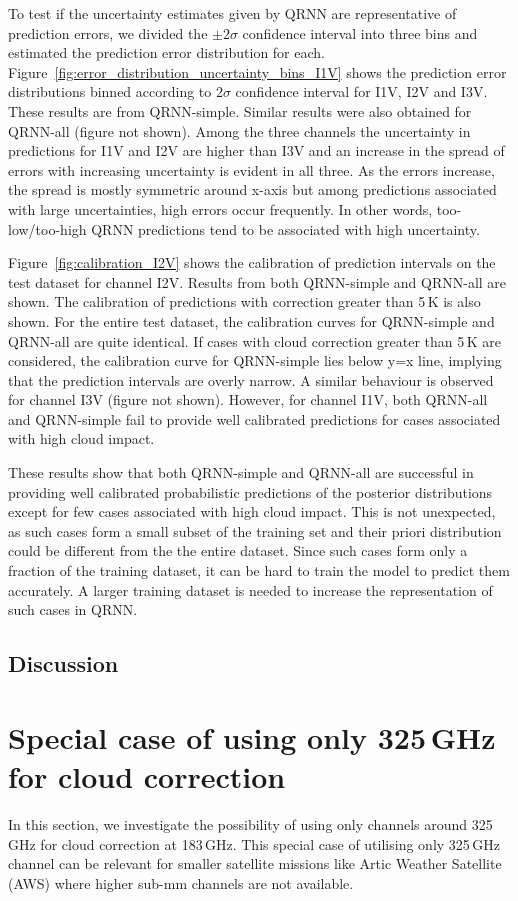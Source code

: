 \documentclass[amt, manuscript]{copernicus}
\begin{document}
To test if the uncertainty estimates given by QRNN are representative of prediction errors, we divided the $\pm2\sigma$ confidence interval into three bins and estimated the prediction error distribution for each. Figure~\ref{fig:error_distribution_uncertainty_bins_I1V} shows the prediction error distributions binned according to $2\sigma$ confidence interval for I1V, I2V and I3V. These results are from QRNN-simple. Similar results were also obtained for QRNN-all (figure not shown). Among the three channels the uncertainty in predictions for I1V and I2V are higher than I3V and an increase in the spread of errors with increasing uncertainty is evident in all three. As the errors increase, the spread is mostly symmetric around x-axis but among predictions associated with large uncertainties, high errors occur frequently. In other words, too-low/too-high QRNN predictions tend to be associated with high uncertainty. 

Figure~\ref{fig:calibration_I2V} shows the calibration of prediction intervals on the test dataset for channel I2V. Results from both QRNN-simple and QRNN-all are shown. The calibration of predictions with correction greater than 5\,K is also shown. For the entire test dataset, the calibration curves for QRNN-simple and QRNN-all are quite identical. If cases with cloud correction greater than 5\,K are considered, the calibration curve for QRNN-simple lies  below y=x line, implying that the prediction intervals are overly narrow. A similar behaviour is observed for channel I3V (figure not shown). However, for channel I1V, both QRNN-all and QRNN-simple fail to provide well calibrated predictions for cases associated with high cloud impact. 

These results show that both QRNN-simple and QRNN-all are successful in providing well calibrated probabilistic predictions of the posterior distributions except for few cases associated with high cloud impact. This is not unexpected, as such cases form a small subset of the training set and their priori distribution could be different from the the entire dataset. 
Since such cases form only a fraction of the training dataset, it can be hard to train the model to predict them accurately. A larger training dataset is needed to increase the representation of such cases in QRNN.    
\subsection{Discussion}

\section{Special case of using only 325\,GHz for cloud correction}
In this section, we investigate the possibility of using only channels around 325\,GHz for cloud correction at 183\,GHz. This special case of utilising only 325\,GHz channel can be relevant for smaller satellite missions like Artic Weather Satellite (AWS) where higher sub-mm channels are not available. 
\end{document}
